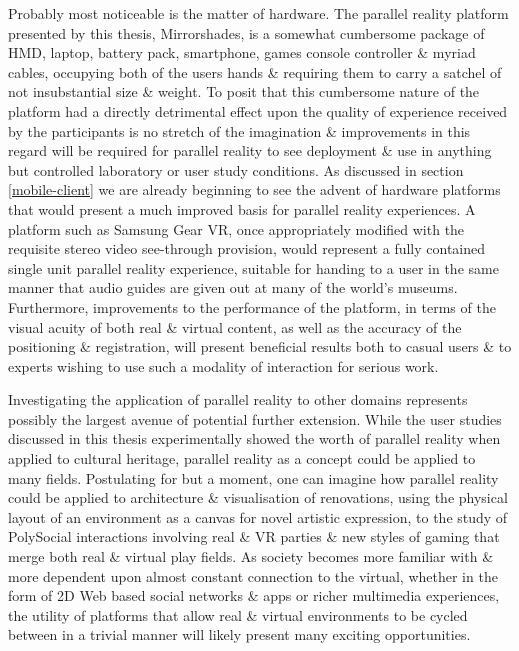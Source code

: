 Probably most noticeable is the matter of hardware. The parallel reality platform presented by this thesis, Mirrorshades, is a somewhat cumbersome package of HMD, laptop, battery pack, smartphone, games console controller \& myriad cables, occupying both of the users hands \& requiring them to carry a satchel of not insubstantial size \& weight. To posit that this cumbersome nature of the platform had a directly detrimental effect upon the quality of experience received by the participants is no stretch of the imagination \& improvements in this regard will be required for parallel reality to see deployment \& use in anything but controlled laboratory or user study conditions. As discussed in section \ref{mobile-client} we are already beginning to see the advent of hardware platforms that would present a much improved basis for parallel reality experiences. A platform such as Samsung Gear VR, once appropriately modified with the requisite stereo video see-through provision, would represent a fully contained single unit parallel reality experience, suitable for handing to a user in the same manner that audio guides are given out at many of the world's museums. Furthermore, improvements to the performance of the platform, in terms of the visual acuity of both real \& virtual content, as well as the accuracy of the positioning \& registration, will present beneficial results both to casual users \& to experts wishing to use such a modality of interaction for serious work.

Investigating the application of parallel reality to other domains represents possibly the largest avenue of potential further extension. While the user studies discussed in this thesis experimentally showed the worth of parallel reality when applied to cultural heritage, parallel reality as a concept could be applied to many fields. Postulating for but a moment, one can imagine how parallel reality could be applied to architecture \& visualisation of renovations, using the physical layout of an environment as a canvas for novel artistic expression, to the study of PolySocial interactions involving real \& VR parties \& new styles of gaming that merge both real \& virtual play fields. As society becomes more familiar with \& more dependent upon almost constant connection to the virtual, whether in the form of 2D Web based social networks \& apps or richer multimedia experiences, the utility of platforms that allow real \& virtual environments to be cycled between in a trivial manner will likely present many exciting opportunities.

